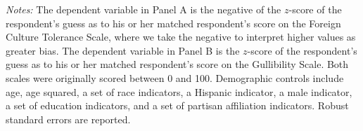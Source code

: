 \begin{table}[!htbp]
\begin{threeparttable}
\begin{tablenotes}
\footnotesize
\item \textit{Notes:} The dependent variable in Panel A is the negative of the $z$-score of the respondent's guess as to his or her matched respondent's score on the Foreign Culture Tolerance Scale, where we take the negative to interpret higher values as greater bias. The dependent variable in Panel B is the $z$-score of the respondent's guess as to his or her matched respondent's score on the Gullibility Scale. Both scales were originally scored between 0 and 100. Demographic controls include age, age squared, a set of race indicators, a Hispanic indicator, a male indicator, a set of education indicators, and a set of partisan affiliation indicators. Robust standard errors are reported.
\end{tablenotes}
\end{threeparttable}
\end{table} 
